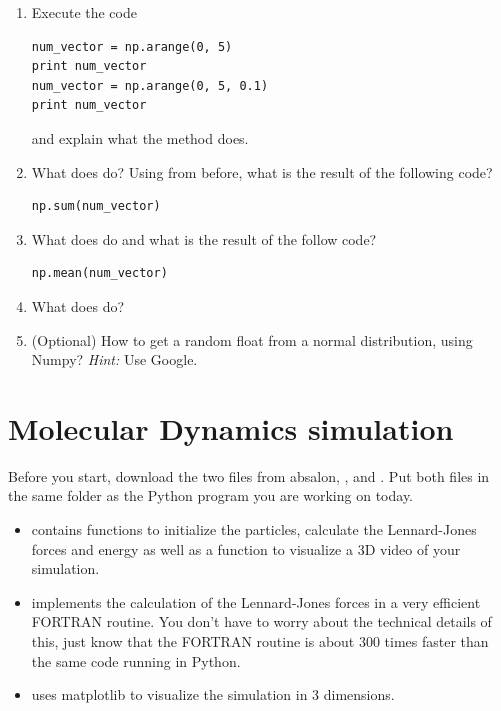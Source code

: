 \documentclass{article}
\begin{document}
\begin{enumerate}[resume]
   \item Execute the code

\begin{lstlisting}
num_vector = np.arange(0, 5)
print num_vector
num_vector = np.arange(0, 5, 0.1)
print num_vector
\end{lstlisting}

   and explain what the method  does.

   \item What does  do? Using  from before, what is the result of the following code?

\begin{lstlisting}
np.sum(num_vector)
\end{lstlisting}


   \item What does  do and what is the result of the follow code?

\begin{lstlisting}
np.mean(num_vector)
\end{lstlisting}

   \item What does  do?

   \item (Optional) How to get a random float from a normal distribution, using Numpy? \newline
       {\em Hint:} Use Google.

\end{enumerate}


\newpage

\section{Molecular Dynamics simulation}

Before you start, download the two files from absalon, ,  and .
Put both files in the same folder as the Python program you are working on today.

\begin{itemize}

    \item {} contains functions to initialize the particles, calculate the Lennard-Jones forces and energy as well as a function to visualize a 3D video of your simulation.
    \item {} implements the calculation of the Lennard-Jones forces in a very efficient FORTRAN routine.
        You don't have to worry about the technical details of this, just know that the FORTRAN routine is about 300 times faster than the same code running in Python.

    \item {} uses matplotlib to visualize the simulation in 3 dimensions.

\end{itemize}
\end{document}

